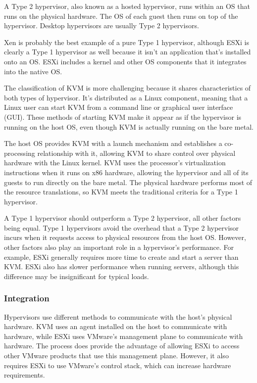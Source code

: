 \documentclass[14pt]{extreport}
\begin{document}
A Type 2 hypervisor, also known as a hosted hypervisor, runs within an OS that runs on the physical hardware. The OS of each guest then runs on top of the hypervisor. Desktop hypervisors are usually Type 2 hypervisors.

Xen is probably the best example of a pure Type 1 hypervisor, although ESXi is clearly a Type 1 hypervisor as well because it isn’t an application that’s installed onto an OS. ESXi includes a kernel and other OS components that it integrates into the native OS.

The classification of KVM is more challenging because it shares characteristics of both types of hypervisor. It’s distributed as a Linux component, meaning that a Linux user can start KVM from a command line or graphical user interface (GUI). These methods of starting KVM make it appear as if the hypervisor is running on the host OS, even though KVM is actually running on the bare metal.

The host OS provides KVM with a launch mechanism and establishes a co-processing relationship with it, allowing KVM to share control over physical hardware with the Linux kernel. KVM uses the processor’s virtualization instructions when it runs on x86 hardware, allowing the hypervisor and all of its guests to run directly on the bare metal. The physical hardware performs most of the resource translations, so KVM meets the traditional criteria for a Type 1 hypervisor.

A Type 1 hypervisor should outperform a Type 2 hypervisor, all other factors being equal. Type 1 hypervisors avoid the overhead that a Type 2 hypervisor incurs when it requests access to physical resources from the host OS. However, other factors also play an important role in a hypervisor’s performance. For example, ESXi generally requires more time to create and start a server than KVM. ESXi also has slower performance when running servers, although this difference may be insignificant for typical loads.
\subsubsection{Integration}
Hypervisors use different methods to communicate with the host’s physical hardware. KVM uses an agent installed on the host to communicate with hardware, while ESXi uses VMware’s management plane to communicate with hardware. The process does provide the advantage of allowing ESXi to access other VMware products that use this management plane. However, it also requires ESXi to use VMware’s control stack, which can increase hardware requirements.
\end{document}
